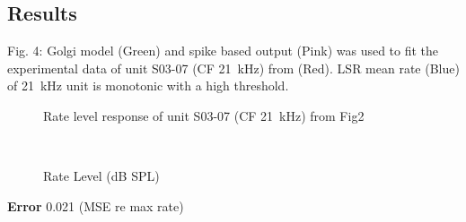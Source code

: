 \clearpage
\subsection{Results}
Fig. 4: Golgi model (Green) and spike based output (Pink) was used to
fit the experimental data of unit S03-07 (CF 21~kHz) from
\citep{GhoshalKim:1996} (Red).  LSR mean rate (Blue) of 21~kHz unit is
monotonic with a high threshold.

\begin{figure}[htb]
  \centering
\caption{Rate level response of unit S03-07 (CF 21~kHz) from Fig2
  \citep{GhoshalKim:1997} }
\end{figure}


\begin{figure}[htb]
  \centering {}
  \\
  \caption{ Rate Level (dB SPL)}
\end{figure}


\textbf{Error} 0.021 (MSE re max rate)



